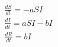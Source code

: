 \documentclass[preview]{standalone}
\begin{document}
\begin{equation*}
\begin{split}
\frac{dS}{dt} = -aSI  \\
\frac{dI}{dt} = aSI-bI \\
\frac{dR}{dt} = bI
\end{split}
\end{equation*}
\end{document}
